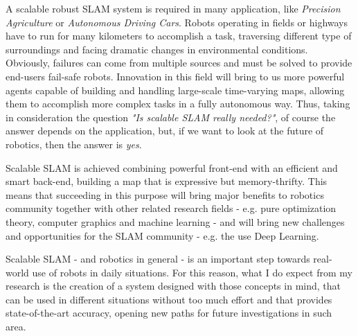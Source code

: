 \documentclass[10pt,a4paper, notitlepage]{report}
\begin{document}
A scalable robust SLAM system is required in many application, like \textit{Precision Agriculture} or \textit{Autonomous Driving Cars}. Robots operating in fields or highways have to run for many kilometers to accomplish a task, traversing different type of surroundings and facing dramatic changes in environmental conditions. Obviously, failures can come from multiple sources and must be solved to provide end-users fail-safe robots. Innovation in this field will bring to us more powerful agents capable of building and handling large-scale time-varying maps, allowing them to accomplish more complex tasks in a fully autonomous way. Thus, taking in consideration the question \textit{"Is scalable SLAM really needed?"}, of course the answer depends on the application, but, if we want to look at the future of robotics, then the answer is \textit{yes}.

Scalable SLAM is achieved combining powerful front-end with an efficient and smart back-end, building a map that is expressive but memory-thrifty. This means that succeeding in this purpose will bring major benefits to robotics community together with other related research fields - e.g. pure optimization theory, computer graphics and machine learning -  and will bring new challenges and opportunities for the SLAM community - e.g. the use Deep Learning. 

\vspace{10px}

Scalable SLAM - and robotics in general - is an important step towards real-world use of robots in daily situations. For this reason, what I do expect from my research is the creation of a system designed with those concepts in mind, that can be used in different situations without too much effort and that provides state-of-the-art accuracy, opening new paths for future investigations in such area.






\end{document}
